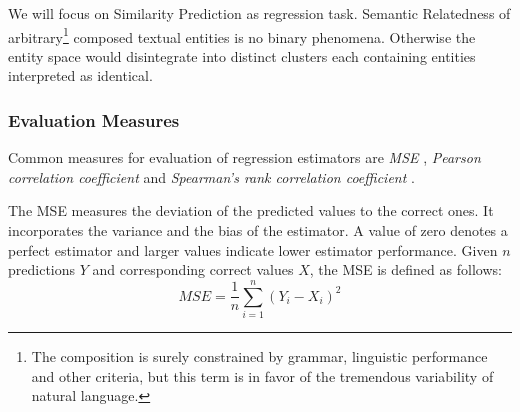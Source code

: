 We will focus on Similarity Prediction as regression task. Semantic Relatedness of arbitrary\footnote{The composition is surely constrained by grammar, linguistic performance and other criteria, but this term is in favor of the tremendous variability of natural language.} composed textual entities is no binary phenomena. Otherwise the entity space would disintegrate into distinct clusters each containing entities interpreted as identical. %

\subsubsection{Evaluation Measures} \label{sec:eval_measures}
Common measures for evaluation of regression estimators are \textit{\acl{MSE}} \autocite[see][]{lehmann_theory_1998}, \textit{Pearson correlation coefficient} \autocite{pearson_note_1895} and \textit{Spearman's rank correlation coefficient} \autocite{spearman_proof_1904}.

The \acf{MSE} measures the deviation of the predicted values to the correct ones. It incorporates the variance and the bias of the estimator. A value of zero denotes a perfect estimator and larger values indicate lower estimator performance. Given $n$ predictions $Y$ and corresponding correct values $X$, the \ac{MSE} is defined as follows:
\begin{equation} \label{eq:eval_measure_mse}
MSE = \frac{1}{n}\displaystyle\sum_{i=1}^{n} (Y_i - X_i)^2
\end{equation}


